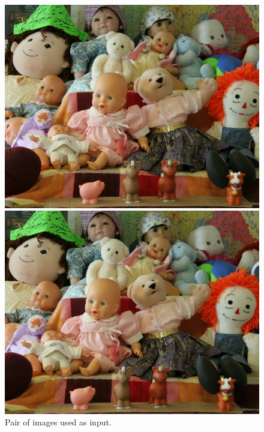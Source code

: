 \documentclass[]{article}
\begin{document}
\begin{figure}[h]
	\centering
	\begin{minipage}{0.47\linewidth}
		\includegraphics[width=\linewidth]{../Seeds/im1.jpg}	
	\end{minipage}\hfill
	\begin{minipage}{0.47\linewidth}
		\includegraphics[width=\linewidth]{../Seeds/im2.jpg}
	\end{minipage}\hfill
	\caption{Pair of images used as input.}
	\label{fig:poupee}
\end{figure}
\end{document}
